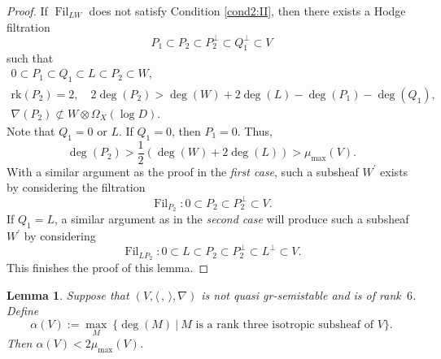 \documentclass[JEP,XML,SOM,Unicode,published]{cedram}
\newcommand{\grsemistable}{gr\nobreakdash-semi\-stable\xspace}
\DeclareMathOperator{\Filt}{Fil}
\newcommand{\rk}{\mathrm{rk}}
\theoremstyle{plain}
\newtheorem{lem}[thm]{Lemma}
\theoremstyle{definition}
\begin{document}
\begin{proof}
If $\Filt_{LW}$ does not satisfy Condition \eqref{cond2:II}, then there exists a Hodge filtration
\[
P_1\subset P_2\subset P_2^\perp\subset Q_1^\perp\subset V
\]
such that
\begin{gather*}
0\subset P_1\subset Q_1\subset L \subset P_2\subset W,
\\
\rk(P_2)=2,\quad 2\deg(P_2)>\deg(W)+2\deg(L)-\deg(P_1)-\deg(Q_1),
\\
\tag*{and}
\nabla(P_2)\not\subset W\otimes\Omega_X(\log D).
\end{gather*}
Note that $Q_1=0$ or $L$. If $Q_1=0$, then $P_1=0$. Thus,
\[
\deg(P_2)>\dfrac{1}{2}(\deg(W)+2\deg(L))>\mu_{\max}(V).
\]
With a similar argument as the proof in the \emph{first case}, such a subsheaf $W^\prime$ exists by considering the filtration
\[
\Filt_{P_2}:0\subset P_2\subset P_2^\perp\subset V.
\]
If $Q_1=L$, a similar argument as in the \emph{second case} will produce such a subsheaf $W^\prime$ by considering
\[
\Filt_{LP_2}:0\subset L\subset P_2\subset P_2^\perp\subset L^\perp\subset V.
\]
This finishes the proof of this lemma.
\end{proof}

\begin{lem}\label{lagrange}
Suppose that $(V,\langle \,, \, \rangle,\nabla)$ is not quasi \grsemistable and is of rank~$6$. Define
\[
\alpha(V):=\max_{M}\ \{\deg(M)\ |\ M \text{ is a rank three isotropic subsheaf of $V$}\}.
\]
Then $\alpha(V)<2\mu_{\max}(V)$.
\end{lem}
\end{document}
